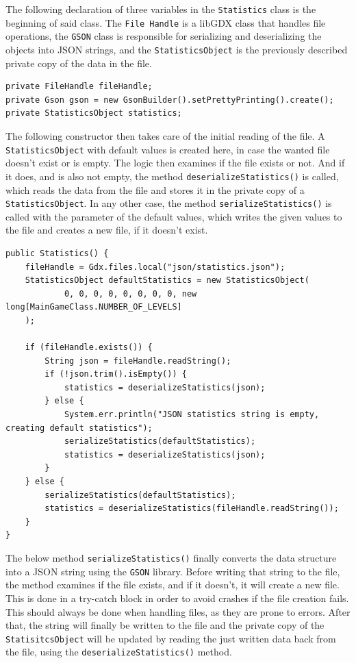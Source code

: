 \documentclass[12p]{article}
\begin{document}
The following declaration of three variables in the \texttt{Statistics} class is the beginning of said class. The \texttt{File Handle} is a libGDX class that handles file operations, the \texttt{GSON} class is responsible for serializing and deserializing the objects into JSON strings, and the \texttt{StatisticsObject} is the previously described private copy of the data in the file.

\begin{verbatim}
private FileHandle fileHandle;
private Gson gson = new GsonBuilder().setPrettyPrinting().create();
private StatisticsObject statistics;
\end{verbatim}

The following constructor then takes care of the initial reading of the file. A \texttt{StatisticsObject} with default values is created here, in case the wanted file doesn't exist or is empty. The logic then examines if the file exists or not. And if it does, and is also not empty, the method \texttt{deserializeStatistics()} is called, which reads the data from the file and stores it in the private copy of a \texttt{StatisticsObject}. In any other case, the method \texttt{serializeStatistics()} is called with the parameter of the default values, which writes the given values to the file and creates a new file, if it doesn't exist.

\begin{verbatim}
public Statistics() {
    fileHandle = Gdx.files.local("json/statistics.json");
    StatisticsObject defaultStatistics = new StatisticsObject(
            0, 0, 0, 0, 0, 0, 0, 0, new long[MainGameClass.NUMBER_OF_LEVELS]
    );

    if (fileHandle.exists()) {
        String json = fileHandle.readString();
        if (!json.trim().isEmpty()) {
            statistics = deserializeStatistics(json);
        } else {
            System.err.println("JSON statistics string is empty, creating default statistics");
            serializeStatistics(defaultStatistics);
            statistics = deserializeStatistics(json);
        }
    } else {
        serializeStatistics(defaultStatistics);
        statistics = deserializeStatistics(fileHandle.readString());
    }
}
\end{verbatim}

The below method \texttt{serializeStatistics()} finally converts the data structure into a JSON string using the \texttt{GSON} library. Before writing that string to the file, the method examines if the file exists, and if it doesn't, it will create a new file. This is done in a try-catch block in order to avoid crashes if the file creation fails. This should always be done when handling files, as they are prone to errors. After that, the string will finally be written to the file and the private copy of the \texttt{StatisitcsObject} will be updated by reading the just written data back from the file, using the \texttt{deserializeStatistics()} method.
\end{document}
